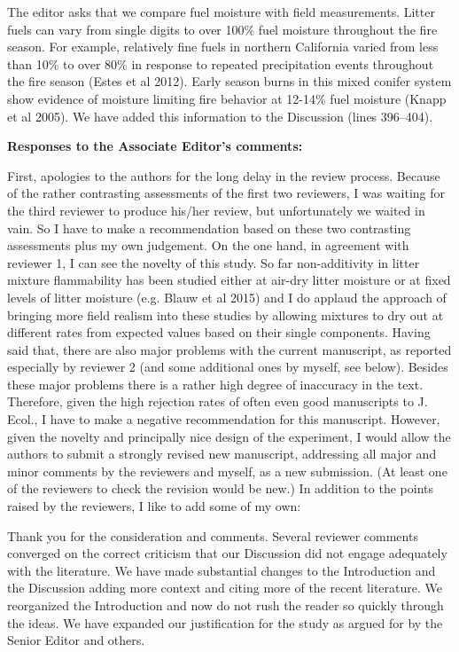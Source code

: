 \documentclass[letterpaper, 12pt]{letter}
\begin{document}
\begin{letter}{}
The editor asks that we compare fuel moisture with field measurements. Litter
fuels can vary from single digits to over 100\% fuel moisture throughout the
fire season. For example, relatively fine fuels in northern California varied
from less than 10\% to over 80\% in response to repeated precipitation events
throughout the fire season (Estes et al 2012). Early season burns in this mixed
conifer system show evidence of moisture limiting fire behavior at 12-14\% fuel
moisture (Knapp et al 2005). We have added this information to the Discussion
(lines 396--404).

{\bf Responses to the Associate Editor's comments:}

\begin{quoting}
  First, apologies to the authors for the long delay in the review process.
  Because of the rather contrasting assessments of the first two reviewers, I
  was waiting for the third reviewer to produce his/her review, but
  unfortunately we waited in vain. So I have to make a recommendation based on
  these two contrasting assessments plus my own judgement. On the one hand, in
  agreement with reviewer 1, I can see the novelty of this study. So far
  non-additivity in litter mixture flammability has been studied either at
  air-dry litter moisture or at fixed levels of litter moisture (e.g. Blauw et
  al 2015) and I do applaud the approach of bringing more field realism into
  these studies by allowing mixtures to dry out at different rates from
  expected values based on their single components. Having said that, there are
  also major problems with the current manuscript, as reported especially by
  reviewer 2 (and some additional ones by myself, see below). Besides these
  major problems there is a rather high degree of inaccuracy in the text.
  Therefore, given the high rejection rates of often even good manuscripts to
  J. Ecol., I have to make a negative recommendation for this manuscript.
  However, given the novelty and principally nice design of the experiment, I
  would allow the authors to submit a strongly revised new manuscript,
  addressing all major and minor comments by the reviewers and myself, as a new
  submission. (At least one of the reviewers to check the revision would be
  new.) In addition to the points raised by the reviewers, I like to add some
  of my own:
\end{quoting}

Thank you for the consideration and comments. Several reviewer comments
converged on the correct criticism that our Discussion did not engage
adequately with the literature. We have made substantial changes to the
Introduction and the Discussion adding more context and citing more of the
recent literature. We reorganized the Introduction and now do not rush the
reader so quickly through the ideas. We have expanded our justification for the
study as argued for by the Senior Editor and others.



\end{letter}
\end{document}
